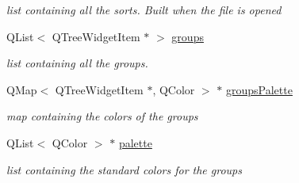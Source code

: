 \begin{DoxyCompactItemize}
\begin{DoxyCompactList}\small\item\em list containing all the sorts. \-Built when the file is opened \end{DoxyCompactList}\item 
\hypertarget{class_tree_area_a49fbc4c7f782976aa082896909c6a351}{\-Q\-List$<$ \-Q\-Tree\-Widget\-Item $\ast$ $>$ \hyperlink{class_tree_area_a49fbc4c7f782976aa082896909c6a351}{groups}}\label{class_tree_area_a49fbc4c7f782976aa082896909c6a351}

\begin{DoxyCompactList}\small\item\em list containing all the groups. \end{DoxyCompactList}\item 
\hypertarget{class_tree_area_a965d3a0fa45f6e31a50db967598f0f90}{\-Q\-Map$<$ \-Q\-Tree\-Widget\-Item $\ast$, \-Q\-Color $>$ $\ast$ \hyperlink{class_tree_area_a965d3a0fa45f6e31a50db967598f0f90}{groups\-Palette}}\label{class_tree_area_a965d3a0fa45f6e31a50db967598f0f90}

\begin{DoxyCompactList}\small\item\em map containing the colors of the groups \end{DoxyCompactList}\item 
\hypertarget{class_tree_area_a7e464d23da2120350b488e1828c13071}{\-Q\-List$<$ \-Q\-Color $>$ $\ast$ \hyperlink{class_tree_area_a7e464d23da2120350b488e1828c13071}{palette}}\label{class_tree_area_a7e464d23da2120350b488e1828c13071}

\begin{DoxyCompactList}\small\item\em list containing the standard colors for the groups \end{DoxyCompactList}\end{DoxyCompactItemize}
